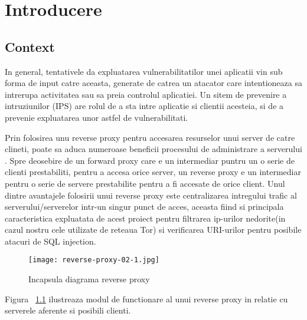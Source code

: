 
\chapter{Introducere}
\label{cap:Introducere}


\section{Context}

In general, tentativele da expluatarea vulnerabilitatilor unei aplicatii vin sub forma de input catre aceasta, generate de catrea un atacator care intentioneaza sa intrerupa activitatea sau sa preia controlul aplicatiei. Un sitem de prevenire a intruziunilor (IPS) are rolul de a sta intre aplicatie si clientii acesteia, si de a prevenie expluatarea unor astfel de vulnerabilitati.

Prin folosirea unu reverse proxy pentru accesarea resurselor unui server de catre clineti, poate sa aduca numeroase beneficii procesului de administrare a serverului \cite{top_8}. Spre deosebire de un forward proxy care e un intermediar puntru un o serie de clienti prestabiliti, pentru a accesa orice server, un reverse proxy e un intermediar pentru o serie de servere prestabilite pentru a fi accesate de orice client. Unul dintre avantajele folosirii unui reverse proxy este centralizarea intregului trafic al serverului/serverelor intr-un singur punct de acces, aceasta fiind si principala caracteristica expluatata de acest proiect pentru filtrarea ip-urilor nedorite(in cazul nostru cele utilizate de reteaua Tor) si verificarea URI-urilor pentru posibile atacuri de SQL injection.

\begin{figure}[h]
	\centering
	\texttt{[image: reverse-proxy-02-1.jpg]}
	\caption{Incapsula diagrama reverse proxy}
	\label{fig:reverse-proxy}
\end{figure}

Figura ~\ref{fig:reverse-proxy} ilustreaza modul de functionare al unui reverse proxy in relatie cu serverele aferente si posibili clienti. \\


